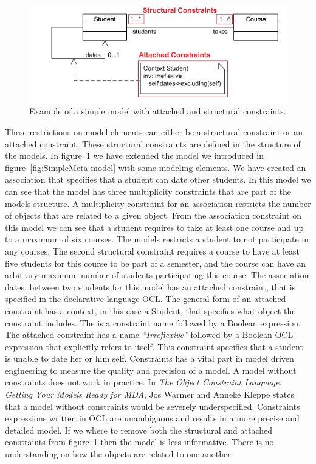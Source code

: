 \begin{figure}[H]
	\centering
	\includegraphics[scale=0.7]{./Figures/Constraints.png}
	\caption[Simple model with constraints]
	{Example of a simple model with attached and structural constraints.}
	\label{fig:Constraints}
\end{figure}

These restrictions on model elements can either be a structural constraint or an
attached constraint. These structural constraints are defined in the structure
of the models. In figure~\ref{fig:Constraints} we have extended the model we
introduced in figure~\ref{fig:SimpleMeta-model} with some  modeling elements. We
have created an association that specifies that a student can date other
students. In this model we can see that the model has three multiplicity
constraints that are part of the models structure. A multiplicity constraint for
an association restricts the number of objects that are related to a given
object. From the association constraint on this model we can see that a student
requires to take at least one course and up to a maximum of six courses. The
models restricts a student to not participate in any courses. The second
structural constraint requires a course to have at least five students for
this course to be part of a semester, and the course can have an arbitrary
maximum number of students participating this course. The association dates,
between two students for this model has an attached constraint, that is
specified in the declarative language OCL. The general form of an attached
constraint has a context, in this case a Student, that specifies what object the
constraint includes. The is a constraint name followed by a Boolean
expression. The attached constraint has a name \textit{``Irreflexive''} followed
by a Boolean OCL expression that explicitly refers to itself. This constraint
specifies that a student is unable to date her or him self. Constraints has a
vital part in model driven engineering to measure the quality and precision of a
model. A model without constraints does not work in practice. In
\textit{The Object Constraint Language: Getting Your Models Ready for
MDA}\cite{Warmer:2003:OCL:861416}, Jos Warmer and Anneke Kleppe states that a
model without constraints would be severely underspecified. Constraints
expressions written in OCL are unambiguous and results in a more precise and
detailed model. If we where to remove both the structural and attached
constraints from figure~\ref{fig:Constraints} then the model is less
informative. There is no understanding on how the objects are related to
one another. 

